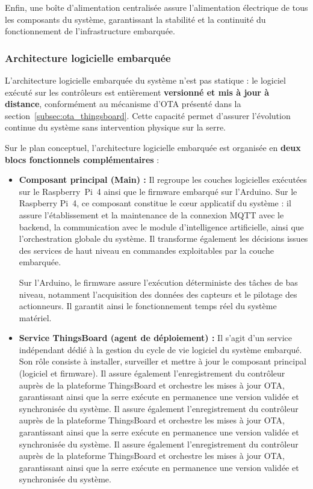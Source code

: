 Enfin, une boîte d’alimentation centralisée assure l’alimentation électrique de tous les composants du système, garantissant la stabilité et la continuité du fonctionnement de l’infrastructure embarquée.


\subsubsection*{Architecture logicielle embarquée}

L’architecture logicielle embarquée du système n’est pas statique : le logiciel exécuté sur les contrôleurs est entièrement \textbf{versionné et mis à jour à distance}, conformément au mécanisme d’OTA présenté dans la section~\ref{subsec:ota_thingsboard}. Cette capacité permet d’assurer l’évolution continue du système sans intervention physique sur la serre.

Sur le plan conceptuel, l’architecture logicielle embarquée est organisée en \textbf{deux blocs fonctionnels complémentaires} :

\begin{itemize}
	\item \textbf{Composant principal (Main) :}  
	Il regroupe les couches logicielles exécutées sur le Raspberry~Pi~4 ainsi que le firmware embarqué sur l’Arduino.  
	Sur le Raspberry Pi~4, ce composant constitue le cœur applicatif du système : il assure l’établissement et la maintenance de la connexion MQTT avec le backend, la communication avec le module d’intelligence artificielle, ainsi que l’orchestration globale du système. Il transforme également les décisions issues des services de haut niveau en commandes exploitables par la couche embarquée.
	
	Sur l’Arduino, le firmware assure l’exécution déterministe des tâches de bas niveau, notamment l’acquisition des données des capteurs et le pilotage des actionneurs. Il garantit ainsi le fonctionnement temps réel du système matériel.
	
	\item \textbf{Service ThingsBoard (agent de déploiement) :}  
	Il s’agit d’un service indépendant dédié à la gestion du cycle de vie logiciel du système embarqué. Son rôle consiste à installer, surveiller et mettre à jour le composant principal (logiciel et firmware).  
	Il assure également l’enregistrement du contrôleur auprès de la plateforme ThingsBoard et orchestre les mises à jour OTA, garantissant ainsi que la serre exécute en permanence une version validée et synchronisée du système.
		Il assure également l’enregistrement du contrôleur auprès de la plateforme ThingsBoard et orchestre les mises à jour OTA, garantissant ainsi que la serre exécute en permanence une version validée et synchronisée du système.	Il assure également l’enregistrement du contrôleur auprès de la plateforme ThingsBoard et orchestre les mises à jour OTA, garantissant ainsi que la serre exécute en permanence une version validée et synchronisée du système.
\end{itemize}

